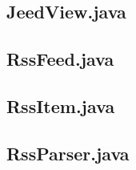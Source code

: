 \documentclass[titlepage, twoside, a4paper, 12pt]{article}
\begin{document}
\newpage
\subsection{JeedView.java}\label{JeedView.java}
\begin{footnotesize}
  
\end{footnotesize}

\newpage
\subsection{RssFeed.java}\label{RssFeed.java}
\begin{footnotesize}
  
\end{footnotesize}

\newpage
\subsection{RssItem.java}\label{RssItem.java}
\begin{footnotesize}
  
\end{footnotesize}

\newpage
\subsection{RssParser.java}\label{RssParser.java}
\begin{footnotesize}
  
\end{footnotesize}
  
\end{document}
